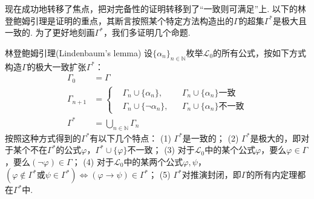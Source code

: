 现在成功地转移了焦点，把对完备性的证明转移到了“一致则可满足”上. 以下的林登鲍姆引理是证明的重点，其断言按照某个特定方法构造出的$\Gamma$的超集$\Gamma^*$是极大且一致的. 为了更好地刻画$\Gamma^*$，我们多证明几个命题.

\begin{lemma}{林登鲍姆引理(Lindenbaum's lemma)}
    设\(\{\alpha_n\}_{n \in \mathbb{N}}\)枚举\(\mathcal{L}_0\)的所有公式，按如下方式构造\(\Gamma\)的极大一致扩张\(\Gamma^*\)：
    \begin{align*}
        \Gamma_0 &= \Gamma \\
        \Gamma_{n+1} &= \left\{ \begin{aligned} & \Gamma_n \cup \{\alpha_n\}, &&\Gamma_n \cup \{\alpha_n\}\mbox{一致} \\ & \Gamma_n \cup \{\neg \alpha_n\}, &&\Gamma_n \cup \{\alpha_n\}\mbox{不一致}\end{aligned} \right. \\
        \Gamma^* &= \bigcup_{n \in \mathbb{N}} \Gamma_n
    \end{align*}
    按照这种方式得到的\(\Gamma^*\)有以下几个特点：\newline
    (1) \(\Gamma^*\)是一致的；\newline
    (2) \(\Gamma^*\)是极大的，即对于某个不在\(\Gamma^*\)的公式\(\varphi\)，\(\Gamma^* \cup \{\varphi\}\)不一致；\newline
    (3) 对于\(\mathcal{L}_0\)中的某个公式\(\varphi\)，要么\(\varphi \in \Gamma\)，要么\((\neg \varphi) \in \Gamma\)；\newline
    (4) 对于\(\mathcal{L}_0\)中的某两个公式\(\varphi, \psi\)，\((\varphi \not \in \Gamma^*\mbox{或}\psi \in \Gamma^*) \Longleftrightarrow (\varphi \to \psi) \in \Gamma^*\)；\newline
    (5) \(\Gamma^*\)对推演封闭，即\(\Gamma\)的所有内定理都在\(\Gamma^*\)中.
\end{lemma}

